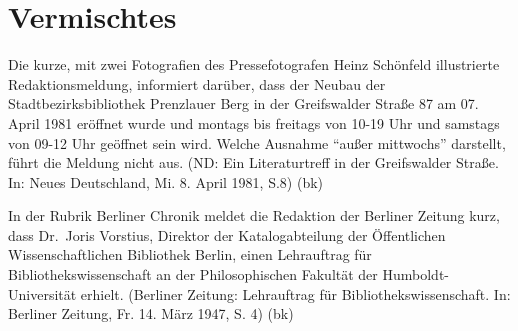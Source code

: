 \documentclass[a4paper,
fontsize=11pt,
oneside,
numbers=noperiodatend,
parskip=half-,
bibliography=totoc,
final
]{scrartcl}
\begin{document}
\hypertarget{vermischtes}{%
\section*{Vermischtes}\label{vermischtes}}

Die kurze, mit zwei Fotografien des Pressefotografen Heinz Schönfeld
illustrierte Redaktionsmeldung, informiert darüber, dass der Neubau der
Stadtbezirksbibliothek Prenzlauer Berg in der Greifswalder Straße 87 am
07. April 1981 eröffnet wurde und montags bis freitags von 10-19 Uhr und
samstags von 09-12 Uhr geöffnet sein wird. Welche Ausnahme
\enquote{außer mittwochs} darstellt, führt die Meldung nicht aus. (ND:
Ein Literaturtreff in der Greifswalder Straße. In: Neues Deutschland,
Mi. 8. April 1981, S.8) (bk)

In der Rubrik Berliner Chronik meldet die Redaktion der Berliner Zeitung
kurz, dass Dr.~Joris Vorstius, Direktor der Katalogabteilung der
Öffentlichen Wissenschaftlichen Bibliothek Berlin, einen Lehrauftrag für
Bibliothekswissenschaft an der Philosophischen Fakultät der
Humboldt-Universität erhielt. (Berliner Zeitung: Lehrauftrag für
Bibliothekswissenschaft. In: Berliner Zeitung, Fr. 14. März 1947, S. 4)
(bk)

\end{document}
